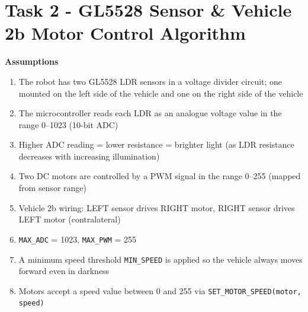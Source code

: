 \documentclass[11 pt , a 4 paper ]{article}
\theoremstyle{definition}
\begin{document}
  \section*{Task 2 - GL5528 Sensor \& Vehicle 2b Motor Control Algorithm}
  \textbf{Assumptions}
  \begin{enumerate}
    \item The robot has two GL5528 LDR sensors in a voltage divider circuit; one mounted on the left side of the vehicle and one on the right side of the vehicle
    \item The microcontroller reads each LDR as an analogue voltage value in the range 0–1023 (10-bit ADC)
    \item Higher ADC reading = lower resistance = brighter light (as LDR resistance decreases with increasing illumination)
    \item Two DC motors are controlled by a PWM signal in the range 0–255 (mapped from sensor range)
    \item Vehicle 2b wiring: LEFT sensor drives RIGHT motor, RIGHT sensor drives LEFT motor (contralateral)
    \item \texttt{MAX\_ADC} = 1023, \texttt{MAX\_PWM} = 255
    \item A minimum speed threshold \texttt{MIN\_SPEED} is applied so the vehicle always moves forward even in darkness
    \item Motors accept a speed value between 0 and 255 via \texttt{SET\_MOTOR\_SPEED(motor, speed)}
  \end{enumerate}
\end{document}
